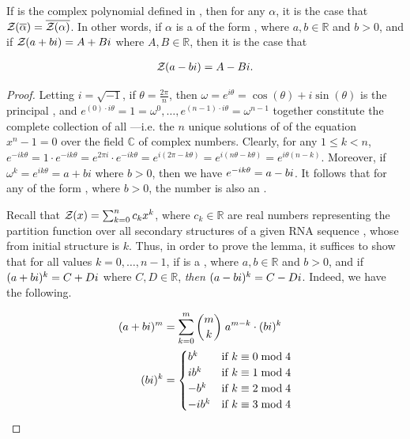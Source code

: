 \begin{lemma}
\label{lem:fftbor:compconj}

If \fullZx is the complex polynomial defined in
, then for any \nRoU
 $\alpha$, it is the case that ${\mathcal Z}_{}(\overline{\alpha}) =
\overline{{\mathcal Z}_{}(\alpha)}$. In other words, if $\alpha$ is a \nRoU
 of the form \aPbi, where $a,b \in \mathbb{R}$ and $b>0$, and
if ${\mathcal Z}_{}(a+bi) = A + Bi$ where $A,B \in \mathbb{R}$, then it is the case that

\begin{align}
{\mathcal Z}_{}(a-bi) = A - Bi.
\end{align}

\end{lemma}

\begin{proof}
Letting $i = \sqrt{-1}$, if
$\theta = \frac{2 \pi}{n}$, then
$\omega = e^{i \theta} = \cos(\theta) + i \sin(\theta)$
is the principal \nRoU, and
$e^{(0) \cdot i \theta} = 1 = \omega^{0}, \dots ,
e^{(n-1) \cdot i \theta} = \omega^{n-1}$ together
constitute the complete collection of all
\nRoUs---i.e. the $n$ unique solutions of
of the equation $x^n -1 = 0$ over the field $\mathbb{C}$ of complex numbers.
Clearly, for any $1 \leq k < n$,
$e^{-i k \theta} = 1 \cdot e^{-i k \theta} =
e^{2 \pi i} \cdot e^{-i k \theta} = e^{i(2 \pi - k \theta)} =
e^{i(n \theta - k \theta)} = e^{i \theta (n - k)}$.
Moreover, if $\omega^k = e^{i k \theta} = a + b i$ where
$b>0$, then we have $e^{-i k \theta} = a-bi$. It follows that for any
\nRoU of the form \aPbi, where $b>0$, the number \aMbi
is also an \nRoU.

Recall that ${\mathcal Z}_{}(x) = \sum_{k=0}^n c_k x^k$, where
$c_k \in \mathbb{R}$ are real numbers representing the partition function
 over
all secondary structures of a given RNA sequence \seqN,
whose \bpd from initial structure
\strSt is $k$. Thus, in order to prove the lemma, it suffices to show
that for all values $k=0,\dots,n-1$, if \aPbi is a
\nRoU, where $a,b \in \mathbb{R}$
and $b>0$, and if $(a+bi)^k = C+Di$ where $C,D \in \mathbb{R}$, {\em then}
$(a-bi)^k = C-Di$. Indeed, we have the following.

\begin{align}
\begin{split}
(a+bi)^m &= \sum_{k=0}^m \binom{m}{k}\; a^{m-k} \cdot (bi)^k \\
(bi)^k  &=
\begin{cases}
b^k    & \text{if $k \equiv 0 \bmod 4$} \\
i b^k  & \text{if $k \equiv 1 \bmod 4$} \\
-b^k   & \text{if $k \equiv 2 \bmod 4$} \\
-i b^k & \text{if $k \equiv 3 \bmod 4$} \\
\end{cases}
\end{split}
\end{align}


\end{proof}
